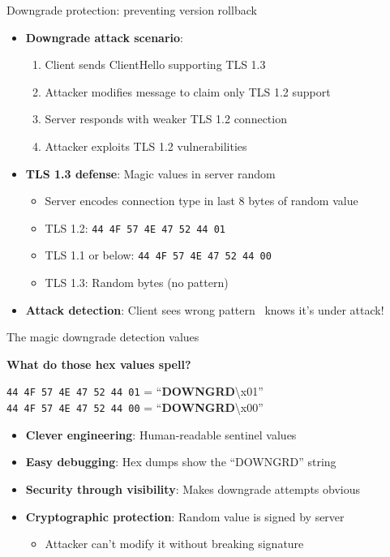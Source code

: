 \ifdefined\PRESENTATION\else\PassOptionsToClass{handout}{beamer}\fi\documentclass[aspectratio=169, lualatex]{beamer}
\begin{document}
\begin{frame}{Downgrade protection: preventing version rollback}
	\begin{itemize}
		\item \textbf{Downgrade attack scenario}:
		      \begin{enumerate}
			      \item Client sends ClientHello supporting TLS 1.3
			      \item Attacker modifies message to claim only TLS 1.2 support
			      \item Server responds with weaker TLS 1.2 connection
			      \item Attacker exploits TLS 1.2 vulnerabilities
		      \end{enumerate}
		\item \textbf{TLS 1.3 defense}: Magic values in server random
		      \begin{itemize}
			      \item Server encodes connection type in last 8 bytes of random value
			      \item TLS 1.2: \texttt{44 4F 57 4E 47 52 44 01}
			      \item TLS 1.1 or below: \texttt{44 4F 57 4E 47 52 44 00}
			      \item TLS 1.3: Random bytes (no pattern)
		      \end{itemize}
		\item \textbf{Attack detection}: Client sees wrong pattern \rightarrow\ knows it's under attack!
	\end{itemize}
\end{frame}

\begin{frame}{The magic downgrade detection values}
	\begin{center}
		\textbf{What do those hex values spell?}
	\end{center}
	\pause
	\begin{center}
		\texttt{44 4F 57 4E 47 52 44 01} = ``\textbf{DOWNGRD}\textbackslash x01''\\
		\texttt{44 4F 57 4E 47 52 44 00} = ``\textbf{DOWNGRD}\textbackslash x00''
	\end{center}
	\pause
	\begin{itemize}
		\item \textbf{Clever engineering}: Human-readable sentinel values
		\item \textbf{Easy debugging}: Hex dumps show the ``DOWNGRD'' string
		\item \textbf{Security through visibility}: Makes downgrade attempts obvious
		\item \textbf{Cryptographic protection}: Random value is signed by server
		      \begin{itemize}
			      \item Attacker can't modify it without breaking signature
		      \end{itemize}
	\end{itemize}
\end{frame}
\end{document}
